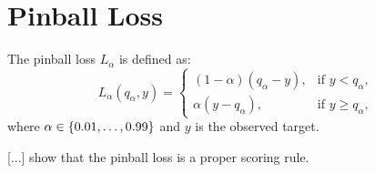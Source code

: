 \section{Pinball Loss}
\label{sec:pinball-loss}

The pinball loss \(L_\alpha\) is defined as: 
\[ L_\alpha(q_\alpha, y) = \begin{cases}
    (1-\alpha)(q_\alpha - y), &\text{if } y < q_\alpha, \\
    \alpha(y - q_\alpha), &\text{if } y \geq q_\alpha,
\end{cases} \]
where \(\alpha \in \{0.01, \ldots, 0.99\}\) and \(y\) is the observed target.

[...] show that the pinball loss is a proper scoring rule.
